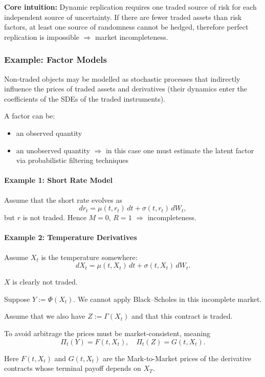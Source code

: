 \documentclass[12pt,a4paper]{article}
\theoremstyle{definition}
\begin{document}
\textbf{Core intuition:} Dynamic replication requires one traded source of risk for each independent source of uncertainty. If there are fewer traded assets than risk factors, at least one source of randomness cannot be hedged, therefore perfect replication is impossible $\Rightarrow$ market incompleteness.

\subsubsection{Example: Factor Models}

Non-traded objects may be modelled as stochastic processes that indirectly influence the prices of traded assets and derivatives (their dynamics enter the coefficients of the SDEs of the traded instruments).

A factor can be:
\begin{itemize}
\item an observed quantity
\item an unobserved quantity $\Rightarrow$ in this case one must estimate the latent factor via probabilistic filtering techniques
\end{itemize}

\paragraph{Example 1: Short Rate Model}

Assume that the short rate evolves as
\[
dr_t = \mu(t, r_t) \, dt + \sigma(t, r_t) \, dW_t,
\]
but $r$ is not traded. Hence $M = 0$, $R = 1$ $\Rightarrow$ incompleteness.

\paragraph{Example 2: Temperature Derivatives}

Assume $X_t$ is the temperature somewhere:
\[
dX_t = \mu(t, X_t) \, dt + \sigma(t, X_t) \, dW_t.
\]

$X$ is clearly not traded.

Suppose $Y := \Phi(X_t)$. We cannot apply Black--Scholes in this incomplete market.

Assume that we also have $Z := \Gamma(X_t)$ and that this contract is traded.

To avoid arbitrage the prices must be market-consistent, meaning
\[
\Pi_t(Y) = F(t, X_t), \quad \Pi_t(Z) = G(t, X_t).
\]

Here $F(t, X_t)$ and $G(t, X_t)$ are the Mark-to-Market prices of the derivative contracts whose terminal payoff depends on $X_T$.
\end{document}
